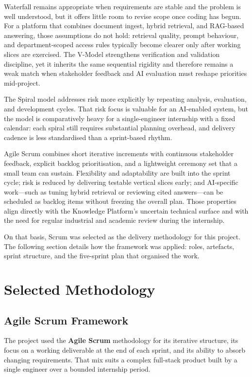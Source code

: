 Waterfall remains appropriate when requirements are stable and the problem is well
understood, but it offers little room to revise scope once coding has begun. For a
platform that combines document ingest, hybrid retrieval, and RAG-based answering,
those assumptions do not hold: retrieval quality, prompt behaviour, and
department-scoped access rules typically become clearer only after working slices
are exercised. The V-Model strengthens verification and validation discipline, yet
it inherits the same sequential rigidity and therefore remains a weak match when
stakeholder feedback and AI evaluation must reshape priorities mid-project.

The Spiral model addresses risk more explicitly by repeating analysis, evaluation,
and development cycles. That risk focus is valuable for an AI-enabled system, but
the model is comparatively heavy for a single-engineer internship with a fixed
calendar: each spiral still requires substantial planning overhead, and delivery
cadence is less standardised than a sprint-based rhythm.

Agile Scrum combines short iterative increments with continuous stakeholder
feedback, explicit backlog prioritisation, and a lightweight ceremony set that a
small team can sustain. Flexibility and adaptability are built into the sprint
cycle; risk is reduced by delivering testable vertical slices early; and AI-specific
work---such as tuning hybrid retrieval or reviewing cited answers---can be
scheduled as backlog items without freezing the overall plan. Those properties
align directly with the Knowledge Platform's uncertain technical surface and with
the need for regular industrial and academic review during the internship.

On that basis, Scrum was selected as the delivery methodology for this project.
The following section details how the framework was applied: roles, artefacts,
sprint structure, and the five-sprint plan that organised the work.

\section{Selected Methodology}

\subsection{Agile Scrum Framework}

The project used the \textbf{Agile Scrum} methodology for its iterative structure,
its focus on a working deliverable at the end of each sprint, and its ability to
absorb changing requirements. That mix suits a complex full-stack product built by
a single engineer over a bounded internship period.

